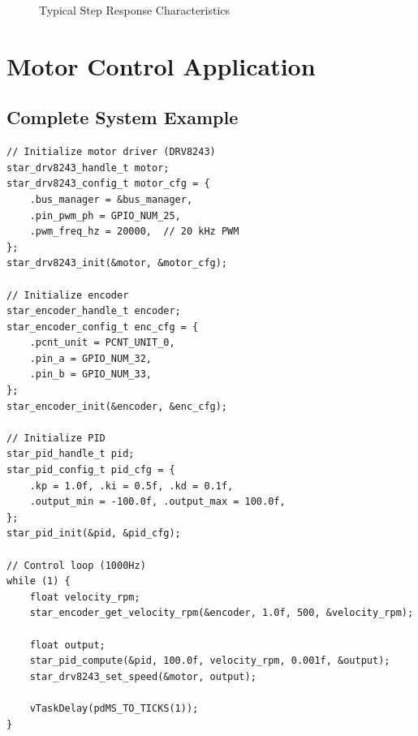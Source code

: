 \documentclass[11pt,a4paper]{article}
\begin{document}
\begin{figure}[h]
\centering
{}
\caption{Typical Step Response Characteristics}
\end{figure}

\section{Motor Control Application}

\subsection{Complete System Example}

\begin{lstlisting}
// Initialize motor driver (DRV8243)
star_drv8243_handle_t motor;
star_drv8243_config_t motor_cfg = {
    .bus_manager = &bus_manager,
    .pin_pwm_ph = GPIO_NUM_25,
    .pwm_freq_hz = 20000,  // 20 kHz PWM
};
star_drv8243_init(&motor, &motor_cfg);

// Initialize encoder
star_encoder_handle_t encoder;
star_encoder_config_t enc_cfg = {
    .pcnt_unit = PCNT_UNIT_0,
    .pin_a = GPIO_NUM_32,
    .pin_b = GPIO_NUM_33,
};
star_encoder_init(&encoder, &enc_cfg);

// Initialize PID
star_pid_handle_t pid;
star_pid_config_t pid_cfg = {
    .kp = 1.0f, .ki = 0.5f, .kd = 0.1f,
    .output_min = -100.0f, .output_max = 100.0f,
};
star_pid_init(&pid, &pid_cfg);

// Control loop (1000Hz)
while (1) {
    float velocity_rpm;
    star_encoder_get_velocity_rpm(&encoder, 1.0f, 500, &velocity_rpm);

    float output;
    star_pid_compute(&pid, 100.0f, velocity_rpm, 0.001f, &output);
    star_drv8243_set_speed(&motor, output);

    vTaskDelay(pdMS_TO_TICKS(1));
}
\end{lstlisting}
\end{document}
